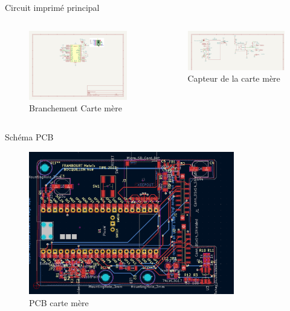 \documentclass{beamer}
\begin{document}
	\begin{frame}{Circuit imprimé principal}
		\begin{columns}
			\begin{column}{0.5\textwidth}
				\begin{figure}
					\includegraphics[width=\textwidth]{Image/SCH MAINboard mcu.png}
					\caption{Branchement Carte mère }
				\end{figure}
			\end{column}
			\begin{column}{0.5\textwidth}
				\begin{figure}
					\includegraphics[width=\textwidth]{Image/Sch mainboard sensor.png}
					\caption{Capteur de la carte mère}
				\end{figure}
			\end{column}
		\end{columns}
	\end{frame}
	\begin{frame}{Schéma PCB}
		\begin{figure}
			\includegraphics[width=0.8\textwidth]{Image/mb pcb.png}
			\caption{PCB carte mère}
		\end{figure}
	\end{frame}
\end{document}
